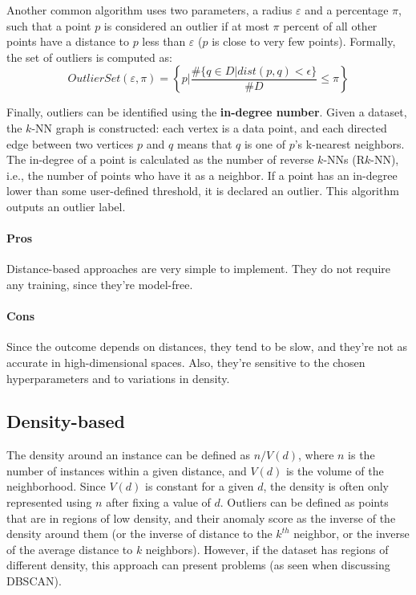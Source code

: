Another common algorithm uses two parameters, a radius $\varepsilon$ and a percentage $\pi$, such that a point $p$ is considered an outlier if at most $\pi$ percent of all other points have a distance to $p$ less than $\varepsilon$ ($p$ is close to very few points). Formally, the set of outliers is computed as:
\begin{equation*}
    \textit{OutlierSet}(\varepsilon, \pi) = \left \{ p | \dfrac{\#\{q \in D | \textit{dist}(p,q) < \epsilon \}}{\# D} \leq \pi \right \}
\end{equation*}

Finally, outliers can be identified using the \textbf{in-degree number}. Given a dataset, the $k$-NN graph is constructed: each vertex is a data point, and each directed edge between two vertices $p$ and $q$ means that $q$ is one of $p$'s k-nearest neighbors. The in-degree of a point is calculated as the number of reverse $k$-NNs (R$k$-NN), i.e., the number of points who have it as a neighbor. If a point has an in-degree lower than some user-defined threshold, it is declared an outlier. This algorithm outputs an outlier label.

\paragraph{Pros} Distance-based approaches are very simple to implement. They do not require any training, since they're model-free.

\paragraph{Cons} Since the outcome depends on distances, they tend to be slow, and they're not as accurate in high-dimensional spaces. Also, they're sensitive to the chosen hyperparameters and to variations in density.

\subsection{Density-based}

The density around an instance can be defined as $n/V(d)$, where $n$ is the number of instances within a given distance, and $V(d)$ is the volume of the neighborhood. Since $V(d)$ is constant for a given $d$, the density is often only represented using $n$ after fixing a value of $d$. Outliers can be defined as points that are in regions of low density, and their anomaly score as the inverse of the density around them (or the inverse of distance to the $k^{th}$ neighbor, or the inverse of the average distance to $k$ neighbors). However, if the dataset has regions of different density, this approach can present problems (as seen when discussing DBSCAN).

